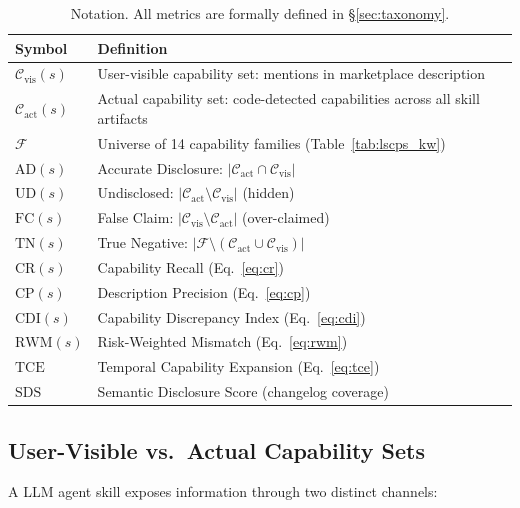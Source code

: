 \begin{table}[h]
\centering
\caption{Notation. All metrics are formally defined in \S\ref{sec:taxonomy}.}
\label{tab:notation}
\small
\begin{tabular}{@{}lp{6.2cm}@{}}
\toprule
\textbf{Symbol} & \textbf{Definition} \\
\midrule
$\mathcal{C}_{\text{vis}}(s)$  & User-visible capability set: mentions in marketplace description \\
$\mathcal{C}_{\text{act}}(s)$  & Actual capability set: code-detected capabilities across all skill artifacts \\
$\mathcal{F}$                  & Universe of 14 capability families (Table~\ref{tab:lscps_kw}) \\
\midrule
$\text{AD}(s)$ & Accurate Disclosure: $|\mathcal{C}_{\text{act}} \cap \mathcal{C}_{\text{vis}}|$ \\
$\text{UD}(s)$ & Undisclosed: $|\mathcal{C}_{\text{act}} \setminus \mathcal{C}_{\text{vis}}|$ (hidden) \\
$\text{FC}(s)$ & False Claim: $|\mathcal{C}_{\text{vis}} \setminus \mathcal{C}_{\text{act}}|$ (over-claimed) \\
$\text{TN}(s)$ & True Negative: $|\mathcal{F} \setminus (\mathcal{C}_{\text{act}} \cup \mathcal{C}_{\text{vis}})|$ \\
\midrule
$\text{CR}(s)$  & Capability Recall (Eq.~\ref{eq:cr}) \\
$\text{CP}(s)$  & Description Precision (Eq.~\ref{eq:cp}) \\
$\text{CDI}(s)$ & Capability Discrepancy Index (Eq.~\ref{eq:cdi}) \\
$\text{RWM}(s)$ & Risk-Weighted Mismatch (Eq.~\ref{eq:rwm}) \\
$\text{TCE}$    & Temporal Capability Expansion (Eq.~\ref{eq:tce}) \\
$\text{SDS}$    & Semantic Disclosure Score (changelog coverage) \\
\bottomrule
\end{tabular}
\end{table}

\subsection{User-Visible vs.\ Actual Capability Sets}

A LLM agent skill exposes information through two distinct channels:

